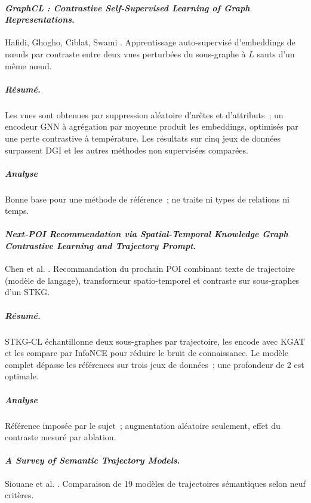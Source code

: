 \documentclass[11pt, french, screen, research-development]{report-rd-info}
\begin{document}

\paragraph{\emph{GraphCL : Contrastive Self-Supervised Learning of Graph Representations}.}
Hafidi, Ghogho, Ciblat, Swami \cite{hafidi2020graphcl}.
 Apprentissage auto-supervisé d'embeddings de nœuds par contraste entre deux vues perturbées du
sous-graphe à $L$ sauts d'un même nœud.

\subparagraph{Résumé.}
 Les vues sont obtenues par suppression aléatoire d'arêtes et d'attributs~; un encodeur GNN à
agrégation par moyenne produit les embeddings, optimisés par une perte contrastive à température.
 Les résultats sur cinq jeux de données surpassent DGI et les autres méthodes non supervisées
comparées.

\subparagraph{Analyse}
Bonne base pour une méthode de référence~; ne traite ni types de relations ni temps.

\paragraph{\emph{Next-POI Recommendation via Spatial-Temporal Knowledge Graph Contrastive Learning and Trajectory Prompt}.}
Chen et al. \cite{chen2025stkgplm}.
 Recommandation du prochain POI combinant texte de trajectoire (modèle de langage), transformeur
spatio-temporel et contraste sur sous-graphes d'un STKG.

\subparagraph{Résumé.}
 STKG-CL échantillonne deux sous-graphes par trajectoire, les encode avec KGAT et les compare par
InfoNCE pour réduire le bruit de connaissance.
 Le modèle complet dépasse les références sur trois jeux de données~; une profondeur de 2 est
optimale.

\subparagraph{Analyse}
 Référence imposée par le sujet~; augmentation aléatoire seulement, effet du contraste mesuré par
ablation.

\paragraph{\emph{A Survey of Semantic Trajectory Models}.}
Siouane et al. \cite{siouane2026survey}.
Comparaison de 19 modèles de trajectoires sémantiques selon neuf critères.
\end{document}
